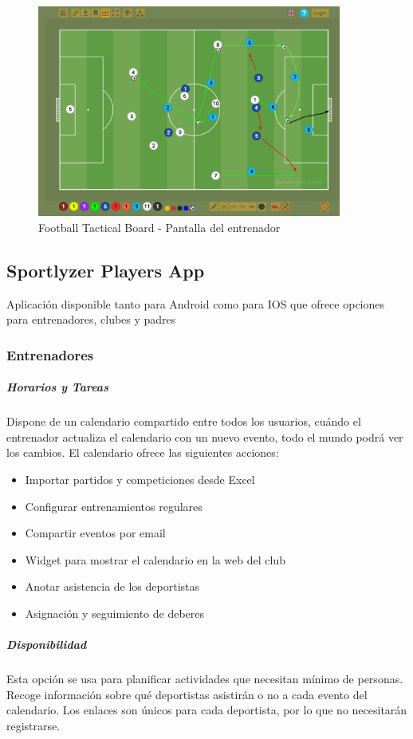 \begin{figure}[H]
    \centering
    \includegraphics[width=10cm]{archivos/tfg_jorge/tbo_pizarra}
    \caption{Football Tactical Board - Pantalla del entrenador}\label{sistemass2}
\end{figure}


\subsection{Sportlyzer Players App}
Aplicación disponible tanto para Android como para IOS que ofrece opciones para entrenadores, clubes y padres

\subsubsection{Entrenadores}

\subparagraph{Horarios y Tareas}
Dispone de un calendario compartido entre todos los usuarios, cuándo el entrenador actualiza el calendario con un nuevo evento, todo el mundo podrá ver los cambios. El calendario ofrece las siguientes acciones:

\begin{itemize}
    \item Importar partidos y competiciones desde Excel
    \item Configurar entrenamientos regulares
    \item Compartir eventos por email
    \item Widget para mostrar el calendario en la web del club
    \item Anotar asistencia de los deportistas
    \item Asignación y seguimiento de deberes
\end{itemize}

\subparagraph{Disponibilidad}
Esta opción se usa para planificar actividades que necesitan mínimo de personas. Recoge información sobre qué deportistas asistirán o no a cada evento del calendario. Los enlaces son únicos para cada deportista, por lo que no necesitarán registrarse.


